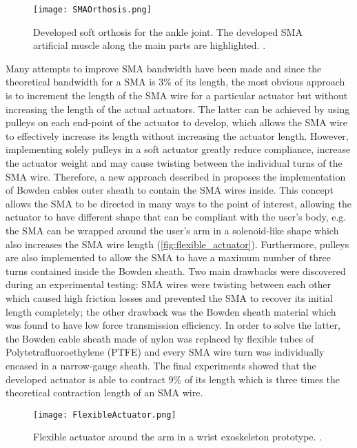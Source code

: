 \begin{figure}[hbtp!]
    \centering
    \texttt{[image: SMAOrthosis.png]}
    \caption{Developed soft orthosis for the ankle joint. The developed SMA artificial muscle along the main parts are highlighted. \cite{Zhang2013a}. }
    \label{fig:SMA_orthosis}
\end{figure}

Many attempts to improve SMA bandwidth have been made and since the theoretical bandwidth for a SMA is 3\% of its length, the most obvious approach is to increment the length of the SMA wire for a particular actuator but without increasing the length of the actual actuators. The latter can be achieved by using pulleys on each end-point of the actuator to develop, which allows the SMA wire to effectively increase its length without increasing the actuator length. However, implementing solely pulleys in a soft actuator greatly reduce compliance, increase the actuator weight and may cause twisting between the individual turns of the SMA wire. Therefore, a new approach described in \cite{Villoslada2015} proposes the implementation of Bowden cables outer sheath to contain the SMA wires inside. This concept allows the SMA to be directed in many ways to the point of interest, allowing the actuator to have different shape that can be compliant with the user's body, e.g. the SMA can be wrapped around the user's arm in a solenoid-like shape which also increases the SMA wire length (\autoref{fig:flexible_actuator}). Furthermore, pulleys are also implemented to allow the SMA to have a maximum number of three turns contained inside the Bowden sheath. Two main drawbacks were discovered during an experimental testing: SMA wires were twisting between each other which caused high friction losses and prevented the SMA to recover its initial length completely; the other drawback was the Bowden sheath material which was found to have low force transmission efficiency. In order to solve the latter, the Bowden cable sheath made of nylon was replaced by flexible tubes of Polytetrafluoroethylene (PTFE) and every SMA wire turn was individually encased in a narrow-gauge sheath. The final experiments showed that the developed actuator is able to contract 9\% of its length which is three times the theoretical contraction length of an SMA wire.

\begin{figure}[hbtp!]
    \centering
    \texttt{[image: FlexibleActuator.png]}
    \caption{Flexible actuator around the arm in a wrist exoskeleton prototype. \cite{Villoslada2015}. }
    \label{fig:flexible_actuator}
\end{figure}

